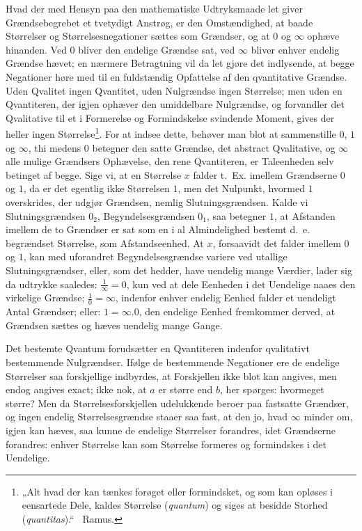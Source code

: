 \documentclass[12pt,a4paper]{book}
\begin{document}
Hvad der med Hensyn paa den mathematiske Udtryksmaade
let giver Grændsebegrebet et tvetydigt Anstrøg,
er den Omstændighed, at baade Størrelser og Størrelsesnegationer
sættes som Grændser, og at $0$ og $\infty$
\setcounter{footnote}{0}
ophæve hinanden. Ved $0$ bliver den endelige Grændse sat,
ved $\infty$ bliver enhver endelig Grændse hævet; en nærmere
Betragtning vil da let gjøre det indlysende, at begge Negationer
høre med til en fuldstændig Opfattelse af den qvantitative
Grændse. Uden Qvalitet ingen Qvantitet, uden Nulgrændse
ingen Størrelse; men uden en Qvantiteren, der igjen
ophæver den umiddelbare Nulgrændse, og forvandler det Qvalitative
til et i Formerelse og Formindskelse svindende Moment,
gives der heller ingen Størrelse\footnote{„Alt hvad der kan tænkes
forøget eller formindsket, og som kan opløses i eensartede Dele, kaldes
Størrelse (\textit{quantum}) og siges at besidde Storhed
(\textit{quantitas}).“ \ Ramus.}. For at indsee dette, behøver
man blot at sammenstille $0$, $1$ og $\infty$, thi medens $0$
betegner den satte Grændse, det abstract Qvalitative, og $\infty$ alle
mulige Grændsers Ophævelse, den rene Qvantiteren, er Taleenheden
selv betinget af begge. Sige vi, at en Størrelse $x$
falder t.~Ex. imellem Grændserne $0$ og $1$, da er det egentlig
ikke Størrelsen $1$, men det Nulpunkt, hvormed $1$ overskrides,
der udgjør Grændsen, nemlig Slutningsgrændsen. Kalde vi
Slutningsgrændsen $0_2$, Begyndelsesgrændsen $0_1$, saa betegner
$1$, at Afstanden imellem de to Grændser er sat som en i al
Almindelighed bestemt d.~e. begrændset Størrelse, som Afstandseenhed.
At $x$, forsaavidt det falder imellem $0$ og $1$,
kan med uforandret Begyndelsesgrændse variere ved utallige
Slutningsgrændser, eller, som det hedder, have uendelig mange
Værdier, lader sig da udtrykke saaledes: $\frac{1}{\infty} = 0$, kun ved
at dele Eenheden i det Uendelige naaes den virkelige Grændse;
$\frac{1}{0} = \infty$, indenfor enhver endelig Eenhed falder et uendeligt
Antal Grændser; eller: $1 = \infty. 0$, den endelige Eenhed
fremkommer derved, at Grændsen sættes og hæves uendelig
mange Gange.

Det bestemte Qvantum forudsætter en Qvantiteren indenfor
qvalitativt bestemmende Nulgrændser. Ifølge de bestemmende
Negationer ere de endelige Størrelser saa forskjellige
indbyrdes, at Forskjellen ikke blot kan angives, men endog
angives exact; ikke nok, at $a$ er større end $b$, her spørges:
hvormeget større? Men da Størrelsesforskjellen udelukkende
beroer paa fastsatte Grændser, og ingen endelig Størrelsesgrændse
staaer saa fast, at den jo, hvad $\infty$ minder om, igjen
kan hæves, saa kunne de endelige Størrelser forandres, idet
Grændserne forandres: enhver Størrelse kan som Størrelse
formeres og formindskes i det Uendelige.
\end{document}
